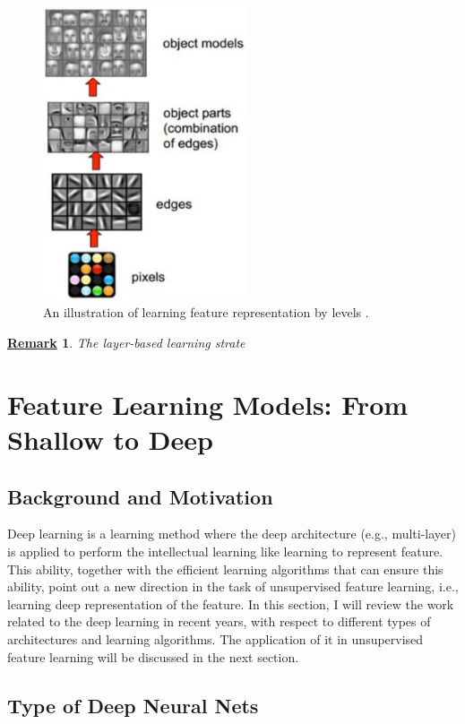 \documentclass[conference]{IEEEtran}
\newtheorem{remark}{\underline{Remark}}
\begin{document}
\begin{figure}[t]
\centering
\includegraphics[width=60mm]{feat_level.pdf}
\caption{An illustration of learning feature representation by levels \cite{face}.}
\label{fig:feat_level}
\end{figure}

\begin{remark}
The layer-based learning strate
\end{remark}

\section{Feature Learning Models: From Shallow to Deep}

\subsection{Background and Motivation}

Deep learning is a learning method where the deep architecture (e.g., multi-layer) is applied to perform the intellectual learning like learning to represent feature. This ability, together with the efficient learning algorithms that can ensure this ability, point out a new direction in the task of unsupervised feature learning, i.e., learning deep representation of the feature. In this section, I will review the work related to the deep learning in recent years, with respect to different types of architectures and learning algorithms. The application of it in unsupervised feature learning will be discussed in the next section.


\subsection{Type of Deep Neural Nets}
\end{document}
